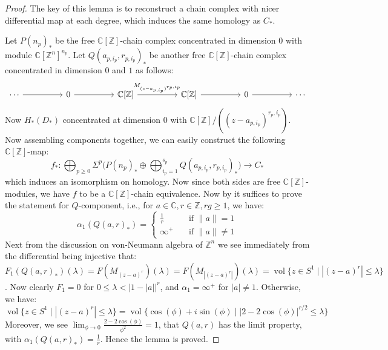 \documentclass[11pt]{report}
\theoremstyle{definition}
\theoremstyle{plain}
\DeclareMathOperator{\vol}{vol}
\newcommand{\complex}{\mathbb{C}}
\newcommand{\integer}{\mathbb{Z}}
\newcommand{\norm}[1]{\lVert #1 \rVert}
\begin{document}
\begin{proof}
	The key of this lemma is to reconstruct a chain complex with nicer differential map at each degree, which induces the same homology as $C_*$.
	\par Let $P(n_p)_*$ be the free $\complex[\integer]$-chain complex concentrated in dimension $0$ with module $\complex[\integer^n]^{n_p}$. Let $Q(a_{p, i_p}, r_{p, i_p})_*$  be another free $\complex[\integer]$-chain complex concentrated in dimension $0$ and $1$ as follows:
\begin{equation*}
\begin{tikzcd}[column sep=huge]
\cdots \rar &0 \rar &\complex[\integer]\rar{M_{(z-a_{p, i_p})^{r_p, i_p}}} &\complex[\integer] \rar &0 \rar &\cdots
\end{tikzcd}
\end{equation*}
Now $H_*(D_*)$ concentrated at dimension $0$ with $\complex[\integer]/((z-a_{p, i_p})^{r_p, i_p})$. Now assembling components together, we can easily construct the following $\complex[\integer]$-map:
\begin{equation*}
f_*: \bigoplus_{p\geq 0} \Sigma^p\Bigg(P(n_p)_*\oplus \bigoplus_{i_p=1}^{s_p}Q(a_{p, i_p}, r_{p, i_p})_* \Bigg) \longrightarrow C_*
\end{equation*}
which induces an isomorphism on homology. Now since both sides are free $\complex[\integer]$-modules, we have $f$ to be a $\complex[\integer]$-chain equivalence. Now by  it suffices to prove the statement for $Q$-component, i.e., for $a\in \complex, r\in \integer, rg\geq 1$, we have:
\begin{equation}
\alpha_1(Q(a, r)_*)=\begin{cases}
\frac{1}{r} \quad &\text{if }\norm{a}=1\\
\infty^+ \quad &\text{if } \norm{a}\neq 1
\end{cases}
\end{equation}
Next from the discussion on von-Neumann algebra of $\integer^n$ we see immediately from the differential being injective that:
$F_1(Q(a,r)_*)(\lambda)=F(M_{(z-a)^r})(\lambda)=F(M_{|(z-a)^r|})(\lambda)=\vol\{z
\in S^1\mid |(z-a)^r|\leq \lambda \}$. Now clearly $F_1=0$ for $0\leq \lambda<|1-|a||^r$, and $\alpha_1=\infty^+$ for $|a|\neq 1$. Otherwise, we have:
\begin{equation}
\vol\{z \in S^1\mid |(z-a)^r|\leq \lambda \}=\vol\{\cos(\phi)+i\sin(\phi)\mid |2-2\cos(\phi)|^{r/2}\leq \lambda\}
\end{equation}
Moreover, we see $\lim_{\phi\to 0}\frac{2-2\cos(\phi)}{\phi^2}=1$, that $Q(a,r)$ has the limit property, with $\alpha_1(Q(a,r)_*)=\frac{1}{r}$. Hence the lemma is proved.
\end{proof}
\end{document}
